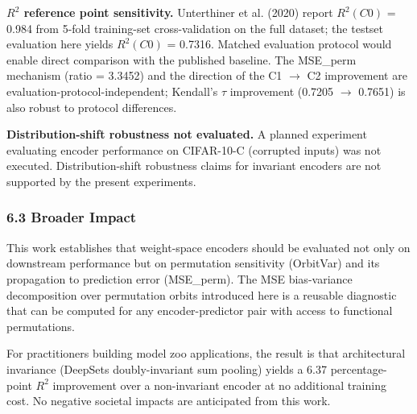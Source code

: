 \textbf{$R^2$ reference point sensitivity.} Unterthiner et al. (2020) report $R^{2}(C0)$ = 0.984 from 5-fold training-set cross-validation on the full dataset; the testset evaluation here yields $R^{2}(C0)$ = 0.7316. Matched evaluation protocol would enable direct comparison with the published baseline. The MSE\_perm mechanism (ratio = 3.3452) and the direction of the C1 $\rightarrow$ C2 improvement are evaluation-protocol-independent; Kendall's $\tau$ improvement (0.7205 $\rightarrow$ 0.7651) is also robust to protocol differences.

\textbf{Distribution-shift robustness not evaluated.} A planned experiment evaluating encoder performance on CIFAR-10-C (corrupted inputs) was not executed. Distribution-shift robustness claims for invariant encoders are not supported by the present experiments.

\subsubsection{6.3 Broader Impact}

This work establishes that weight-space encoders should be evaluated not only on downstream performance but on permutation sensitivity (OrbitVar) and its propagation to prediction error (MSE\_perm). The MSE bias-variance decomposition over permutation orbits introduced here is a reusable diagnostic that can be computed for any encoder-predictor pair with access to functional permutations.

For practitioners building model zoo applications, the result is that architectural invariance (DeepSets doubly-invariant sum pooling) yields a 6.37 percentage-point $R^2$ improvement over a non-invariant encoder at no additional training cost. No negative societal impacts are anticipated from this work.

